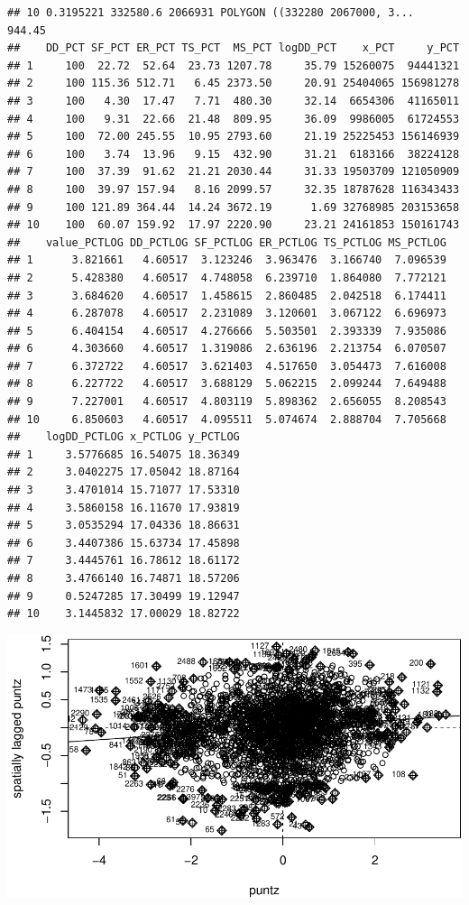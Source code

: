 \documentclass[11pt,]{article}
\begin{document}
\begin{verbatim}
## 10 0.3195221 332580.6 2066931 POLYGON ((332280 2067000, 3...    944.45
##    DD_PCT SF_PCT ER_PCT TS_PCT  MS_PCT logDD_PCT    x_PCT     y_PCT
## 1     100  22.72  52.64  23.73 1207.78     35.79 15260075  94441321
## 2     100 115.36 512.71   6.45 2373.50     20.91 25404065 156981278
## 3     100   4.30  17.47   7.71  480.30     32.14  6654306  41165011
## 4     100   9.31  22.66  21.48  809.95     36.09  9986005  61724553
## 5     100  72.00 245.55  10.95 2793.60     21.19 25225453 156146939
## 6     100   3.74  13.96   9.15  432.90     31.21  6183166  38224128
## 7     100  37.39  91.62  21.21 2030.44     31.33 19503709 121050909
## 8     100  39.97 157.94   8.16 2099.57     32.35 18787628 116343433
## 9     100 121.89 364.44  14.24 3672.19      1.69 32768985 203153658
## 10    100  60.07 159.92  17.97 2220.90     23.21 24161853 150161743
##    value_PCTLOG DD_PCTLOG SF_PCTLOG ER_PCTLOG TS_PCTLOG MS_PCTLOG
## 1      3.821661   4.60517  3.123246  3.963476  3.166740  7.096539
## 2      5.428380   4.60517  4.748058  6.239710  1.864080  7.772121
## 3      3.684620   4.60517  1.458615  2.860485  2.042518  6.174411
## 4      6.287078   4.60517  2.231089  3.120601  3.067122  6.696973
## 5      6.404154   4.60517  4.276666  5.503501  2.393339  7.935086
## 6      4.303660   4.60517  1.319086  2.636196  2.213754  6.070507
## 7      6.372722   4.60517  3.621403  4.517650  3.054473  7.616008
## 8      6.227722   4.60517  3.688129  5.062215  2.099244  7.649488
## 9      7.227001   4.60517  4.803119  5.898362  2.656055  8.208543
## 10     6.850603   4.60517  4.095511  5.074674  2.888704  7.705668
##    logDD_PCTLOG x_PCTLOG y_PCTLOG
## 1     3.5776685 16.54075 18.36349
## 2     3.0402275 17.05042 18.87164
## 3     3.4701014 15.71077 17.53310
## 4     3.5860158 16.11670 17.93819
## 5     3.0535294 17.04336 18.86631
## 6     3.4407386 15.63734 17.45898
## 7     3.4445761 16.78612 18.61172
## 8     3.4766140 16.74871 18.57206
## 9     0.5247285 17.30499 19.12947
## 10    3.1445832 17.00029 18.82722
\end{verbatim}

\includegraphics{proyecto_f_files/figure-latex/unnamed-chunk-11-1.pdf}
\end{document}
